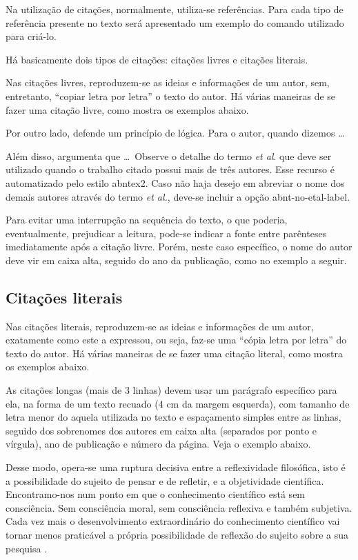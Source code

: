 Na utilização de citações, normalmente, utiliza-se referências.
Para cada tipo de referência presente no texto será apresentado um exemplo do comando utilizado para criá-lo.

Há basicamente dois tipos de citações: citações livres e citações literais.

Nas citações livres, reproduzem-se as ideias e informações de um autor, sem, entretanto, ``copiar letra por letra'' o texto do autor.
Há várias maneiras de se fazer uma citação livre, como mostra os exemplos abaixo.

Por outro lado,  defende um princípio de lógica.
Para o autor, quando dizemos \ldots

Além disso,  argumenta que \ldots\mbox{ }Observe o detalhe do termo \textit{et al}.
que deve ser utilizado quando o trabalho citado possui mais de três autores.
Esse recurso é automatizado pelo estilo {\ttfamily abntex2}.
Caso não haja desejo em abreviar o nome dos demais autores através do termo \textit{et al.}, deve-se incluir a opção {\ttfamily abnt-no-etal-label}.

Para evitar uma interrupção na sequência do texto, o que poderia, eventualmente, prejudicar a leitura, pode-se indicar a fonte entre parênteses imediatamente após a citação livre.
Porém, neste caso específico, o nome do autor deve vir em caixa alta, seguido do ano da publicação, como no exemplo a seguir.



\subsection{Citações literais}\label{citacoesLiterais}
Nas citações literais, reproduzem-se as ideias e informações de um autor, exatamente como este a expressou, ou seja, faz-se uma ``cópia letra por letra'' do texto do autor.
Há várias maneiras de se fazer uma citação literal, como mostra os exemplos abaixo.

As citações longas (mais de 3 linhas) devem usar um parágrafo específico para ela, na forma de um texto recuado (4 cm da margem esquerda), com tamanho de letra menor do aquela utilizada no texto e espaçamento simples entre as linhas, seguido dos sobrenomes dos autores em caixa alta (separados por ponto e vírgula), ano de publicação e número da página.
Veja o exemplo abaixo.

\begin{citacao}
Desse modo, opera-se uma ruptura decisiva entre a reflexividade filosófica, isto é a possibilidade do sujeito de pensar e de refletir, e a objetividade científica.
Encontramo-nos num ponto em que o conhecimento científico está sem consciência.
Sem consciência moral, sem consciência reflexiva e também subjetiva.
Cada vez mais o desenvolvimento extraordinário do conhecimento científico vai tornar menos praticável a própria possibilidade de reflexão do sujeito sobre a sua pesquisa \cite[p.~28]{morinmoigne:2000}.
\end{citacao}

